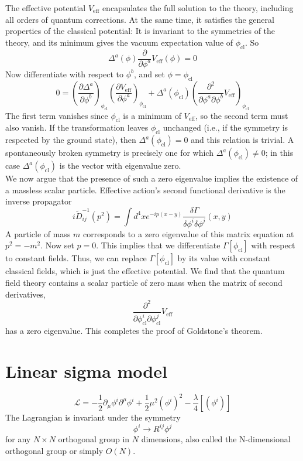 The effective potential $V_{\mathrm{eff}}$ encapsulates the full solution to the theory, including all orders of quantum corrections. At the same time, it satisfies the general properties of the classical potential: It is invariant to the symmetries of the theory, and its minimum gives the vacuum expectation value of $\phi_{\mathrm{cl}}$. So
\[\Delta^a(\phi) \frac{\partial}{\partial \phi^a} V_{\mathrm{eff}}(\phi) = 0\]
Now differentiate with respect to $\phi^b$, and set $\phi = \phi_{\mathrm{cl}}$
\[0 = \left( \frac{\partial \Delta^a}{\partial \phi^b} \right)_{\phi_{\mathrm{cl}}} \left( \frac{\partial V_{\mathrm{eff}}}{\partial \phi^a}\right)_{\phi_{\mathrm{cl}}} + \Delta^a(\phi_{\mathrm{cl}}) \left( \frac{\partial^2}{\partial \phi^a \partial \phi^b}V_{\mathrm{eff}}\right)_{\phi_{\mathrm{cl}}}\]
The first term vanishes since $\phi_{\mathrm{cl}}$ is a minimum of $V_{\mathrm{eff}}$, so the second term must also vanish. If the transformation leaves $\phi_{\mathrm{cl}}$ unchanged (i.e., if the symmetry is respected by the ground state), then $\Delta^a(\phi_{\mathrm{cl}})=0$ and this relation is trivial. A spontaneously broken symmetry is precisely one for which $\Delta^a(\phi_{\mathrm{cl}}) \neq 0$; in this
case $\Delta^a(\phi_{\mathrm{cl}})$ is the vector with eigenvalue zero.\\

We now argue that the presence of such a zero eigenvalue implies the existence of a massless scalar particle. Effective action's second functional derivative is the inverse propagator
\[i\tilde{D}_{ij}^{-1}(p^2) = \int d^4x e^{-ip(x-y)} \frac{\delta \Gamma}{\delta \phi^i \delta \phi^j}(x,y)\]
A particle of mass $m$ corresponds to a zero eigenvalue of this matrix equation at $p^2 = - m^2$. Now set $p=0$. This implies that we differentiate $\Gamma[\phi_{\mathrm{cl}}]$ with respect to constant fields. Thus, we can replace $\Gamma[\phi_{\mathrm{cl}}]$ by its value with constant
classical fields, which is just the effective potential. We find that the quantum field theory contains a scalar particle of zero mass when the matrix of second derivatives,
\[\frac{\partial^2}{\partial \phi^i_{\mathrm{cl}} \partial \phi^j_{\mathrm{cl}}}V_{\mathrm{eff}}\]
has a zero eigenvalue. This completes the proof of Goldstone's theorem. 

\section{Linear sigma model}
\[\mathcal{L} = -\frac{1}{2} \partial_{\mu} \phi^i \partial^{\mu}\phi^i + \frac{1}{2} \mu^2 (\phi^i)^2 - \frac{\lambda}{4} [(\phi^i)]\]
The Lagrangian is invariant under the symmetry
\[\phi^i \to R^{ij} \phi^j\]
for any $N \times N$ orthogonal group in $N$ dimensions, also called the N-dimensional orthogonal group or simply $O(N)$.



